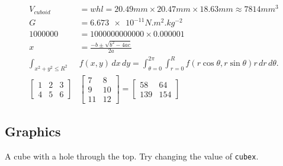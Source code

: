 \begin{align*}
	V_{cuboid} &= w h l = 20.49\si{mm} \times 20.47\si{mm} \times 18.63\si{mm} \approx 7814\si{mm^{3}} \\ 
	G &= \num{6.673e-11}\si{N.m^{2}.kg^{-2}} \\ 
	\num{1000000} &= \num{1000000000000} \times \num{0.000001} \\
	x &= \frac{-b \pm \sqrt{b^2 - 4ac}}{2a} \\
	\int_{x^2 + y^2 \leq R^2} & f(x,y)\,dx\,dy
	    = \int_{\theta=0}^{2\pi} \int_{r=0}^R f(r\cos\theta,r\sin\theta) r\,dr\,d\theta. \\
    \begin{bmatrix} 1 & 2 & 3 \\ 4 & 5 & 6 \end{bmatrix}&
        \begin{bmatrix} 7 & 8 \\ 9 & 10 \\ 11 & 12 \end{bmatrix} =
        \begin{bmatrix} 58 & 64 \\ 139 & 154 \end{bmatrix}
\end{align*}

\subsection{Graphics}

A cube with a hole through the top. Try changing the value of \texttt{cubex}.

\begin{figure}[H]
    \label{fig:cube}
\end{figure}

